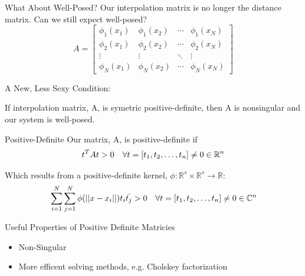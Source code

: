 \documentclass[12pt,t]{beamer}
\newcommand{\bi}{\begin{itemize}}
\newcommand{\ei}{\end{itemize}}
\newcommand{\subt}[1]{{\footnotesize \color{subtitle} {#1}}}
\begin{document}
\begin{frame}{What About Well-Posed?}
Our interpolation matrix is no longer the distance matrix. Can we still expect well-posed?
\begin{equation*}
A=
\begin{bmatrix}
\phi_1(x_1) & \phi_1(x_2) & \cdots & \phi_1(x_N)\\
\phi_2(x_1) & \phi_2(x_2)& \cdots & \phi_2(x_N)\\
\vdots & \vdots & \ddots & \vdots\\
\phi_N(x_1) & \phi_N(x_2)& \cdots & \phi_N(x_N)
\end{bmatrix}
\end{equation*}

\subt{A New, Less Sexy Condition:}

If interpolation matrix, A, is symetric \subt{positive-definite}, then A is nonsingular and our system is well-posed.

\note{}
\end{frame}

\begin{frame}{Positive-Definite}
Our matrix, A, is \subt{positive-definite} if
\begin{align*}
& t^TAt>0 & \forall t=\left[ t_1, t_2, \mathellipsis, t_n\right]\neq 0 \in \mathbb{R}^n
\end{align*}

Which results from a \subt{positive-definite} kernel, $\phi: \mathbb{R}^s \times \mathbb{R}^s \rightarrow \mathbb{R}$:
\begin{align*}
&\sum_{i=1}^N \sum_{j=1}^N \phi(||x-x_i||)t_i\bar{t_j}>0 &\forall t=\left[ t_1, t_2, \mathellipsis, t_n\right]\neq 0 \in \mathbb{C}^n
\end{align*}

\subt{Useful Properties of Positive Definite Matricies}
\bi
\item Non-Singular
\item More efficent solving methods, e.g. Cholskey factorization
\ei

\note{}
\end{frame}
\end{document}
